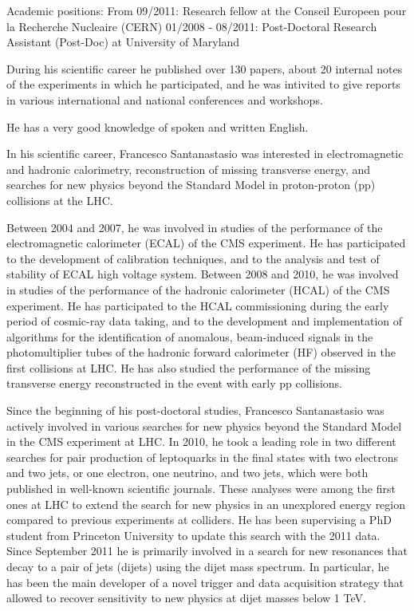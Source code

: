 \documentclass[10pt, a4paper]{article}
\begin{document}
Academic positions: 
From 09/2011: Research fellow at the Conseil Europeen pour la Recherche Nucleaire (CERN)
01/2008 - 08/2011: Post-Doctoral Research Assistant (Post-Doc) at University of Maryland

During his scientific career he published over 130 papers, about 20 internal notes of the experiments in which he participated, and he was intivited to give reports in various international and national conferences and workshops. 

He has a very good knowledge of spoken and written English. 

In his scientific career, Francesco Santanastasio was interested in electromagnetic and hadronic calorimetry, reconstruction of missing transverse energy, and searches for new physics beyond the Standard Model in proton-proton (pp) collisions at the LHC.

Between 2004 and 2007, he was involved in studies of the performance of the electromagnetic calorimeter (ECAL) of the CMS experiment. He has participated to the development of calibration techniques, and to the analysis and test of stability of ECAL high voltage system.
Between 2008 and 2010, he was involved in studies of the performance of the hadronic calorimeter (HCAL) of the CMS experiment. He has participated to the HCAL commissioning during the early period of cosmic-ray data taking, and to the development and implementation of algorithms for the identification of anomalous, beam-induced signals in the photomultiplier tubes of the hadronic forward calorimeter (HF) observed in the first collisions at LHC. He has also studied the performance of the missing transverse energy reconstructed in the event with early pp collisions. 

Since the beginning of his post-doctoral studies, Francesco Santanastasio was actively involved in various searches for new physics beyond the Standard Model in the CMS experiment at LHC. In 2010, he took a leading role in two different searches for pair production of leptoquarks in the final states with two electrons and two jets, or one electron, one neutrino, and two jets, which were both published in well-known scientific journals. These analyses were among the first ones at LHC to extend the search for new physics in an unexplored energy region compared to previous experiments at colliders. He has been supervising a PhD student from Princeton University to update this search with the 2011 data. Since September 2011 he is primarily involved in a search for new resonances that decay to a pair of jets (dijets) using the dijet mass spectrum. In particular, he has been the main developer of a novel trigger and data acquisition strategy that allowed to recover sensitivity to new physics at dijet masses below 1 TeV.
\end{document}
